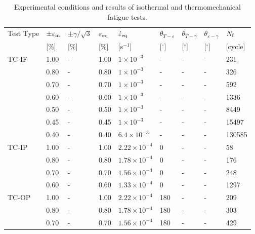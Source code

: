 \documentclass[preprint,5p,twocolumn,11pt,sort&compress]{elsarticle}
\begin{document}
\begin{table*}[htbp]
  \centering
  \caption{Experimental conditions and results of isothermal and thermomechanical fatigue tests.} \vspace{0.1cm}
    \begin{tabular}{p{2cm}p{1.5cm}<{\centering}p{1.5cm}<{\centering}p{1.5cm}<{\centering}p{2.5cm}<{\centering}p{1cm}<{\centering}p{1cm}<{\centering}p{1cm}<{\centering}p{1cm}}
    \hline
    Test Type & $\pm \varepsilon _{\rm m}$ & $\pm \gamma/ \sqrt 3$ & $\varepsilon _{\rm eq}$ & $\dot \varepsilon _{\rm eq}$ & $\theta_{T-\varepsilon}$ & $\theta_{T-\gamma}$ & $\theta_{\varepsilon-\gamma}$ & $N_{\rm f}$ \\
          & [\%]  & [\%]  & [\%]  & [s$^{-1}$] & [$^\circ$] & [$^\circ$] & [$^\circ$] & [cycle] \\
    \hline
    TC-IF & 1.00  & -     & 1.00  & $1\times 10^{-3}$ & -     & -     & -     & 231 \\
          & 0.80  & -     & 0.80  & $1\times 10^{-3}$ & -     & -     & -     & 326 \\
          & 0.70  & -     & 0.70  & $1\times 10^{-3}$ & -     & -     & -     & 592 \\
          & 0.60  & -     & 0.60  & $1\times 10^{-3}$ & -     & -     & -     & 1336 \\
          & 0.50  & -     & 0.50  & $1\times 10^{-3}$ & -     & -     & -     & 8449 \\
          & 0.45  & -     & 0.45  & $1\times 10^{-3}$ & -     & -     & -     & 15497 \\
          & 0.40  & -     & 0.40  & $6.4\times 10^{-3}$ & -     & -     & -     & 130585 \\
    \hline
    TC-IP & 1.00  & -     & 1.00  & $2.22\times 10^{-4}$ & 0     & -     & -     & 58 \\
          & 0.80  & -     & 0.80  & $1.78\times 10^{-4}$ & 0     & -     & -     & 176 \\
          & 0.70  & -     & 0.70  & $1.56\times 10^{-4}$ & 0     & -     & -     & 248 \\
          & 0.60  & -     & 0.60  & $1.33\times 10^{-4}$ & 0     & -     & -     & 1297 \\
    \hline
    TC-OP & 1.00  & -     & 1.00  & $2.22\times 10^{-4}$ & 180   & -     & -     & 209 \\
          & 0.80  & -     & 0.80  & $1.78\times 10^{-4}$ & 180   & -     & -     & 303 \\
          & 0.70  & -     & 0.70  & $1.56\times 10^{-4}$ & 180   & -     & -     & 429 \\

\end{tabular}
\end{table*}
\end{document}
